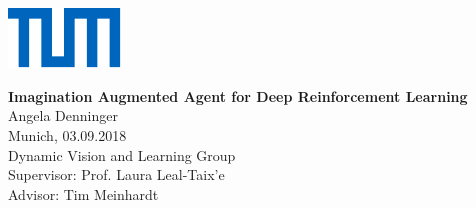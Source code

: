 \newcommand{\thema}{Imagination Augmented Agent for Deep Reinforcement Learning}
\newcommand{\schlagworte}{}

\newcommand{\zusammenfassung}{bla

\vspace*{0.3cm}

blub
}


\newcommand{\autor}{Angela Denninger}
\newcommand{\autorStrasse}{Hindenburgstr. 13}
\newcommand{\autorPLZ}{78467 }
\newcommand{\autorOrt}{Garching bei München}

\newcommand{\autorGeburtsort}{Tübingen}
\newcommand{\autorGeburtsdatum}{17.06.1990}

\newcommand{\supervisor}{Prof. Laura Leal-Taix'e}
\newcommand{\advisor}{Tim Meinhardt}


\newpage

\begin{titlepage}

\vspace*{-1.5cm}
\begin{flushleft}
\hspace*{-1cm} \includegraphics[width=3.0cm]{Images/Universitaet_Logo_RGB}
\end{flushleft}

\vspace{2.5cm}

\begin{center}
	\huge{\textbf{\thema}} \\[1.5cm]

	\LARGE{\autor} \\[0.5cm]
	
	\large{Munich, 03.09.2018}\\[2.3cm]	
	
	\Large{Dynamic Vision and Learning Group}\\[1.5cm]
	
	\large{Supervisor: \supervisor}\\
	\large{Advisor: \advisor}
\end{center}

\vspace*{3.5cm}



\end{titlepage}

